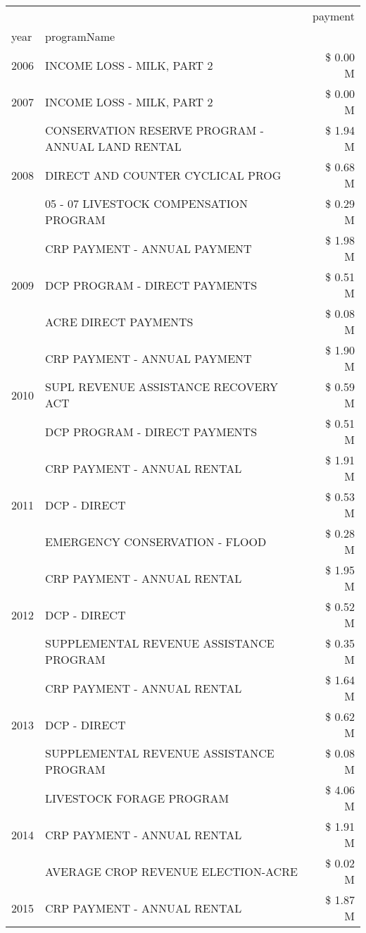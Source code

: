 \begin{tabular}{llr}
\toprule
 &  & payment \\
year & programName &  \\
\midrule
2006 & INCOME LOSS - MILK, PART 2 & \$ 0.00 M \\
\cline{1-3}
2007 & INCOME LOSS - MILK, PART 2 & \$ 0.00 M \\
\cline{1-3}
\multirow[t]{3}{*}{2008} & CONSERVATION RESERVE PROGRAM - ANNUAL LAND RENTAL & \$ 1.94 M \\
 & DIRECT AND COUNTER CYCLICAL PROG & \$ 0.68 M \\
 & 05 - 07 LIVESTOCK COMPENSATION PROGRAM & \$ 0.29 M \\
\cline{1-3}
\multirow[t]{3}{*}{2009} & CRP PAYMENT - ANNUAL PAYMENT & \$ 1.98 M \\
 & DCP PROGRAM - DIRECT PAYMENTS & \$ 0.51 M \\
 & ACRE DIRECT PAYMENTS & \$ 0.08 M \\
\cline{1-3}
\multirow[t]{3}{*}{2010} & CRP PAYMENT - ANNUAL PAYMENT & \$ 1.90 M \\
 & SUPL REVENUE ASSISTANCE RECOVERY ACT & \$ 0.59 M \\
 & DCP PROGRAM - DIRECT PAYMENTS & \$ 0.51 M \\
\cline{1-3}
\multirow[t]{3}{*}{2011} & CRP PAYMENT - ANNUAL RENTAL & \$ 1.91 M \\
 & DCP - DIRECT & \$ 0.53 M \\
 & EMERGENCY CONSERVATION - FLOOD & \$ 0.28 M \\
\cline{1-3}
\multirow[t]{3}{*}{2012} & CRP PAYMENT - ANNUAL RENTAL & \$ 1.95 M \\
 & DCP - DIRECT & \$ 0.52 M \\
 & SUPPLEMENTAL REVENUE ASSISTANCE PROGRAM & \$ 0.35 M \\
\cline{1-3}
\multirow[t]{3}{*}{2013} & CRP PAYMENT - ANNUAL RENTAL & \$ 1.64 M \\
 & DCP - DIRECT & \$ 0.62 M \\
 & SUPPLEMENTAL REVENUE ASSISTANCE PROGRAM & \$ 0.08 M \\
\cline{1-3}
\multirow[t]{3}{*}{2014} & LIVESTOCK FORAGE PROGRAM & \$ 4.06 M \\
 & CRP PAYMENT - ANNUAL RENTAL & \$ 1.91 M \\
 & AVERAGE CROP REVENUE ELECTION-ACRE & \$ 0.02 M \\
\cline{1-3}
\multirow[t]{3}{*}{2015} & CRP PAYMENT - ANNUAL RENTAL & \$ 1.87 M \\

\end{tabular}
